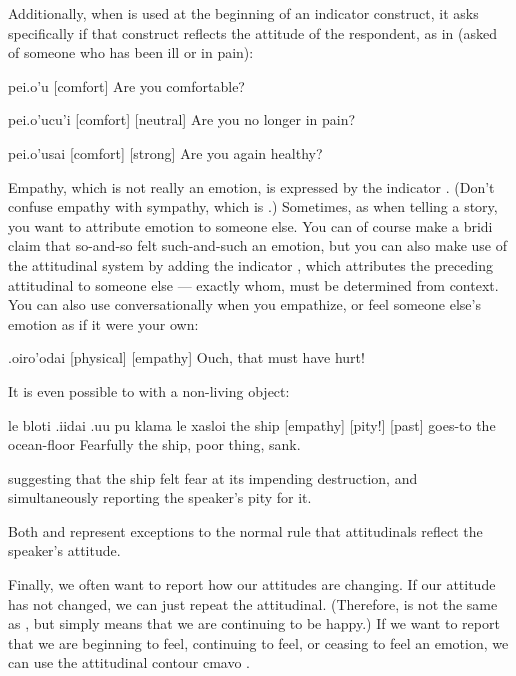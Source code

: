 Additionally, when  is used at the beginning of an
    indicator construct, it asks specifically if that construct
    reflects the attitude of the respondent, as in (asked of
    someone who has been ill or in pain):
\begin{example}
pei.o'u\n
{} [comfort]\n
Are you comfortable?
\end{example}

\begin{example}
pei.o'ucu'i\n
{} [comfort] [neutral]\n
Are you no longer in pain?
\end{example}

\begin{example}
pei.o'usai\n
{} [comfort] [strong]\n
Are you again healthy?
\end{example}

Empathy, which is not really an emotion, is expressed by the
    indicator . (Don't confuse empathy with sympathy, which
    is .) Sometimes, as when telling a story, you
    want to attribute emotion to someone else. You can of course
    make a bridi claim that so-and-so felt such-and-such an
    emotion, but you can also make use of the attitudinal system by
    adding the indicator , which attributes the preceding
    attitudinal to someone else --- exactly whom, must be
    determined from context. You can also use 
    conversationally when you empathize, or feel someone else's
    emotion as if it were your own:
\begin{example}
.oiro'odai\n
{} [physical] [empathy]\n
Ouch, that must have hurt!
\end{example}

It is even possible to  with a non-living
    object:
\begin{example}
le bloti .iidai .uu pu\n
\T	klama le xasloi\n
the ship  [empathy] [pity!] [past]\n
\T	goes-to the ocean-floor\n
Fearfully the ship, poor thing, sank.
\end{example}

{\noindent}suggesting that the ship felt fear at its impending
    destruction, and simultaneously reporting the speaker's pity
    for it. 

Both  and  represent exceptions to the normal
    rule that attitudinals reflect the speaker's attitude.

Finally, we often want to report how our attitudes are
    changing. If our attitude has not changed, we can just repeat
    the attitudinal. (Therefore,  is not the same as
    , but simply means that we are continuing to be
    happy.) If we want to report that we are beginning to feel,
    continuing to feel, or ceasing to feel an emotion, we can use
    the attitudinal contour cmavo .

